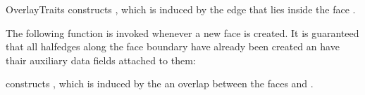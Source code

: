 \begin{ccRefConcept}{OverlayTraits}
    {constructs , which is induced by the edge  that lies
     inside the face .}

The following function is invoked whenever a new face is created. It is
guaranteed that all halfedges along the face boundary have already been
created an have thair auxiliary data fields attached to them:

    {constructs , which is induced by the an overlap between the
     faces  and .}

\ccHasModels

\\
\\

\ccSeeAlso

\end{ccRefConcept}

\ccRefPageEnd

